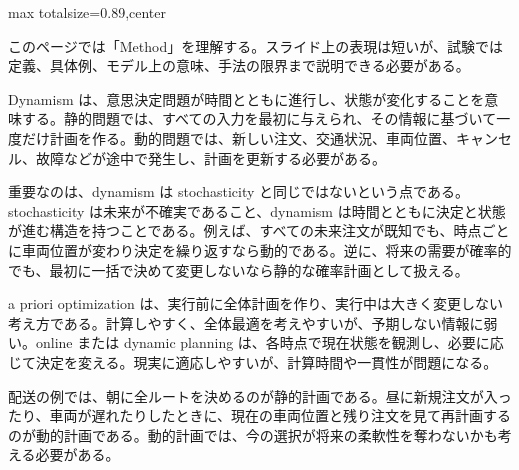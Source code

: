\begin{minipage}[t]{0.58\textwidth}
\begin{adjustbox}{max totalsize={\textwidth}{0.89\textheight},center}
\begin{minipage}{\textwidth}\scriptsize
{}このページでは「Method」を理解する。スライド上の表現は短いが、試験では定義、具体例、モデル上の意味、手法の限界まで説明できる必要がある。\par
Dynamism は、意思決定問題が時間とともに進行し、状態が変化することを意味する。静的問題では、すべての入力を最初に与えられ、その情報に基づいて一度だけ計画を作る。動的問題では、新しい注文、交通状況、車両位置、キャンセル、故障などが途中で発生し、計画を更新する必要がある。\par
重要なのは、dynamism は stochasticity と同じではないという点である。stochasticity は未来が不確実であること、dynamism は時間とともに決定と状態が進む構造を持つことである。例えば、すべての未来注文が既知でも、時点ごとに車両位置が変わり決定を繰り返すなら動的である。逆に、将来の需要が確率的でも、最初に一括で決めて変更しないなら静的な確率計画として扱える。\par
a priori optimization は、実行前に全体計画を作り、実行中は大きく変更しない考え方である。計算しやすく、全体最適を考えやすいが、予期しない情報に弱い。online または dynamic planning は、各時点で現在状態を観測し、必要に応じて決定を変える。現実に適応しやすいが、計算時間や一貫性が問題になる。\par
配送の例では、朝に全ルートを決めるのが静的計画である。昼に新規注文が入ったり、車両が遅れたりしたときに、現在の車両位置と残り注文を見て再計画するのが動的計画である。動的計画では、今の選択が将来の柔軟性を奪わないかも考える必要がある。\par

\end{minipage}
\end{adjustbox}
\end{minipage}
